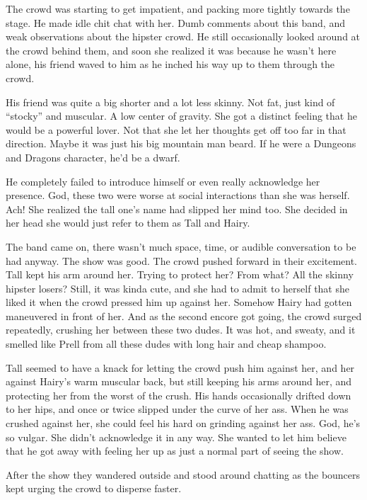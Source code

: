\documentclass[letterpaper]{article}
\begin{document}
\begin{multicols}{2}
The crowd was starting to get impatient, and packing more tightly towards the stage. He made idle chit chat with her.
Dumb comments about this band, and weak observations about the hipster crowd.
He still occasionally looked around at the crowd behind them, and soon she realized it was because he wasn't here alone, his friend waved to him as he inched his way up to them through the crowd.

His friend was quite a big shorter and a lot less skinny.
Not fat, just kind of ``stocky'' and muscular.
A low center of gravity. She got a distinct feeling that he would be a powerful lover.
Not that she let her thoughts get off too far in that direction.
Maybe it was just his big mountain man beard.
If he were a Dungeons and Dragons character, he'd be a dwarf.

He completely failed to introduce himself or even really acknowledge her presence. God, these two were worse at social interactions than she was herself. Ach!
She realized the tall one's name had slipped her mind too.
She decided in her head she would just refer to them as Tall and Hairy.

The band came on, there wasn't much space, time, or audible conversation to be had anyway.
The show was good. The crowd pushed forward in their excitement.
Tall kept his arm around her. 
Trying to protect her? From what? All the skinny hipster losers?
Still, it was kinda cute, and she had to admit to herself that she liked it when the crowd pressed him up against her.
Somehow Hairy had gotten maneuvered in front of her.
And as the second encore got going, the crowd surged repeatedly, crushing her between these two dudes. It was hot, and sweaty, and it smelled like Prell from all these dudes with long hair and cheap shampoo.

Tall seemed to have a knack for letting the crowd push him against her, and her against Hairy's warm muscular back, but still keeping his arms around her, and protecting her from the worst of the crush. 
His hands occasionally drifted down to her hips, and once or twice slipped under the curve of her ass. 
When he was crushed against her, she could feel his hard on grinding against her ass.
God, he's so vulgar.
She didn't acknowledge it in any way. 
She wanted to let him believe that he got away with feeling her up as just a normal part of seeing the show.

After the show they wandered outside and stood around chatting as the bouncers kept urging the crowd to disperse faster.


\end{multicols}
\end{document}
